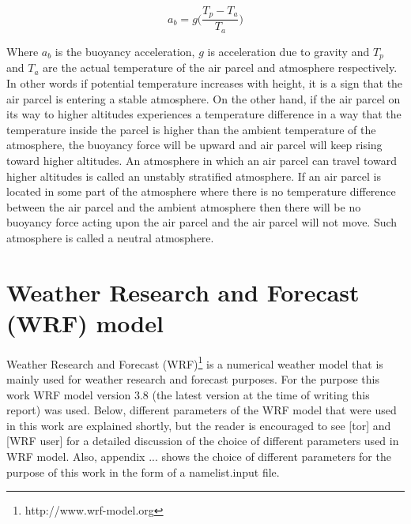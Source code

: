 \documentclass[a4paper,12pt]{article}
\numberwithin{equation}{section} %
\begin{document}
\vspace{0.5cm}
\begin{equation}\label{eq:2}
a_b = g\bigg(\frac{T_p - T_a}{T_a}\bigg)
\end{equation}

\vspace{0.25cm}

Where $a_b$ is the buoyancy acceleration, $g$ is acceleration due to gravity and $T_p$ and $T_a$ are the actual temperature of the air parcel and atmosphere respectively. In other words if potential temperature increases with height, it is a sign that the air parcel is entering a stable atmosphere. On the other hand, if the air parcel on its way to higher altitudes experiences a temperature difference in a way that the temperature inside the parcel is higher than the ambient temperature of the atmosphere, the buoyancy force will be upward and air parcel will keep rising toward higher altitudes. An atmosphere in which an air parcel can travel toward higher altitudes is called an unstably stratified atmosphere. If an air parcel is located in some part of the atmosphere where there is no temperature difference between the air parcel and the ambient atmosphere then there will be no buoyancy force acting upon the air parcel and the air parcel will not move. Such atmosphere is called a neutral atmosphere.

\section{Weather Research and Forecast (WRF) model}

Weather Research and Forecast (WRF)\footnote{http://www.wrf-model.org} is a numerical weather model that is mainly used for weather research and forecast purposes. 
For the purpose this work WRF model version 3.8 (the latest version at the time of writing this report) was used. Below, different parameters of the WRF model that were used in this work are explained shortly, but the reader is encouraged to see [tor] and [WRF user] for a detailed discussion of the choice of different parameters used in WRF model. Also, appendix ... shows the choice of different parameters for the purpose of this work in the form of a namelist.input file. 

\end{document}
